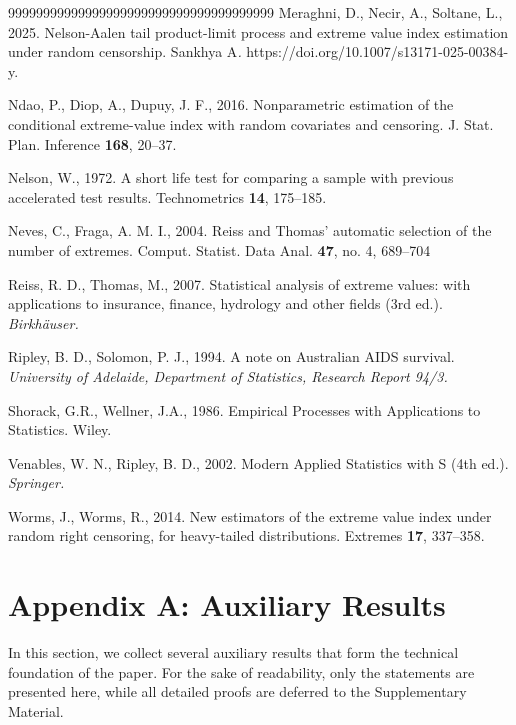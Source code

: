 \documentclass[reqno,openbib,runningheads,a4paper,12pt]{amsart}%
\begin{document}
\begin{thebibliography}{99999999999999999999999999999999999999}
Meraghni, D., Necir, A.,
Soltane, L., 2025. Nelson-Aalen tail product-limit process and extreme value
index estimation under random censorship.\textit{ }Sankhya A\textit{. }https://doi.org/10.1007/s13171-025-00384-y.

Ndao, P., Diop, A., Dupuy, J. F., 2016.
Nonparametric estimation of the conditional extreme-value index with random
covariates and censoring. J. Stat. Plan. Inference \textbf{168}, 20--37.

Nelson, W., 1972. A short life test for
comparing a sample with previous accelerated test results. Technometrics
\textbf{14}, 175--185.

Neves, C., Fraga, A. M. I., 2004. Reiss
and Thomas' automatic selection of the number of extremes. Comput. Statist.
Data Anal. \textbf{47}, no. 4, 689--704

Reiss, R. D., Thomas, M., 2007.
Statistical analysis of extreme values: with applications to insurance,
finance, hydrology and other fields (3rd ed.). \textit{Birkh\"{a}user.}

Ripley, B. D., Solomon, P. J., 1994.
A note on Australian AIDS survival. \textit{University of Adelaide, Department
of Statistics, Research Report 94/3.}

Shorack, G.R., Wellner, J.A., 1986.
Empirical Processes with Applications to Statistics. Wiley.

Venables, W. N., Ripley, B. D.,
2002. Modern Applied Statistics with S (4th ed.). \textit{Springer.}

Worms, J., Worms, R., 2014. New
estimators of the extreme value index under random right censoring, for
heavy-tailed distributions. Extremes \textbf{17}, 337--358.
\end{thebibliography}

\section{\textbf{Appendix A: Auxiliary Results}}

\noindent In this section, we collect several auxiliary results that form the
technical foundation of the paper. For the sake of readability, only the
statements are presented here, while all detailed proofs are deferred to the
Supplementary Material.\smallskip
\end{document}
